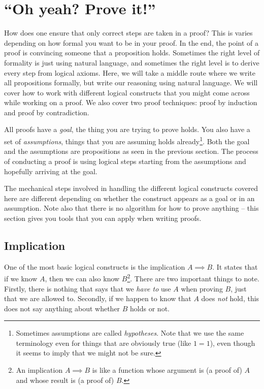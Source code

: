 \documentclass{tufte-handout}
\begin{document}
\section{``Oh yeah? Prove it!''}

How does one ensure that only correct steps are taken in a proof?
This is varies depending on how formal you want to be in your
proof. In the end, the point of a proof is convincing someone that
a proposition holds. Sometimes the right level of formality is
just using natural language, and sometimes the right level is to
derive every step from logical axioms.
%
Here, we will take a middle route where we write all propositions
formally, but write our reasoning using natural language.
%
We will cover how to work with different logical constructs that
you might come across while working on a proof. We also cover two
proof techniques: proof by induction and proof by contradiction.

All proofs have a \emph{goal}, the thing you are trying to prove
holds. You also have a set of \emph{assumptions}, things that you
are assuming holds already\footnote{Sometimes assumptions are
  called \emph{hypotheses}. Note that we use the same terminology
  even for things that are obviously true (like $1=1$), even
  though it seems to imply that we might not be sure.}. Both the
goal and the assumptions are propositions as seen in the previous
section. The process of conducting a proof is using logical steps
starting from the assumptions and hopefully arriving at the goal.

The mechanical steps involved in handling the different logical
constructs covered here are different depending on whether the
construct appears as a goal or in an assumption. Note also that
there is no algorithm for how to prove anything -- this section
gives you tools that you can apply when writing proofs.


\subsection{Implication}

One of the most basic logical constructs is the implication
$A \!\!\implies\!\! B$. It states that if we know $A$, then we can also
know $B$\footnote{An implication $A \implies B$ is like a function
  whose argument is (a proof of) $A$ and whose result is (a proof
  of) $B$.}. There are two important things to note. Firstly,
there is nothing that says that we \emph{have to} use $A$ when
proving $B$, just that we are allowed to. Secondly, if we happen
to know that $A$ does \emph{not} hold, this does not say anything
about whether $B$ holds or not.
\end{document}
